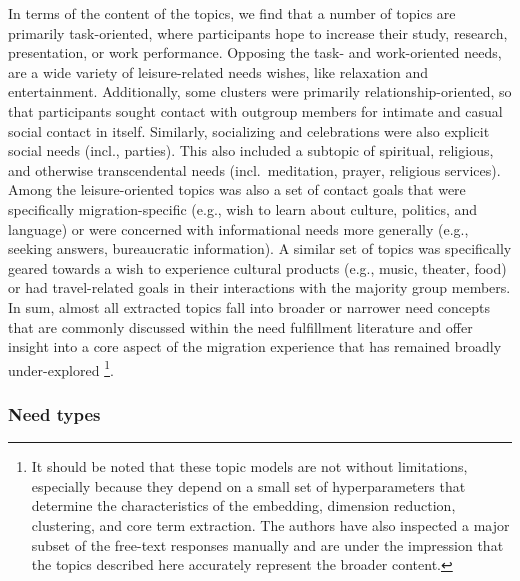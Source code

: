 In terms of the content of the topics, we find that a number of topics
are primarily task-oriented, where participants hope to increase their
study, research, presentation, or work performance. Opposing the task-
and work-oriented needs, are a wide variety of leisure-related needs
wishes, like relaxation and entertainment. Additionally, some clusters
were primarily relationship-oriented, so that participants sought
contact with outgroup members for intimate and casual social contact in
itself. Similarly, socializing and celebrations were also explicit
social needs (incl., parties). This also included a subtopic of
spiritual, religious, and otherwise transcendental needs
(incl.~meditation, prayer, religious services). Among the
leisure-oriented topics was also a set of contact goals that were
specifically migration-specific (e.g., wish to learn about culture,
politics, and language) or were concerned with informational needs more
generally (e.g., seeking answers, bureaucratic information). A similar
set of topics was specifically geared towards a wish to experience
cultural products (e.g., music, theater, food) or had travel-related
goals in their interactions with the majority group members. In sum,
almost all extracted topics fall into broader or narrower need concepts
that are commonly discussed within the need fulfillment literature
\citep[e.g.,][]{orehek2018a} and offer insight into a core aspect of the
migration experience that has remained broadly under-explored
\citep[][]{Kreienkamp2022d}\footnote{It should be noted that these topic models are not without limitations, especially because they depend on a small set of hyperparameters that determine the characteristics of the embedding, dimension reduction, clustering, and core term extraction. The authors have also inspected a major subset of the free-text responses manually and are under the impression that the topics described here accurately represent the broader content.}.

\subsubsection{Need types}

